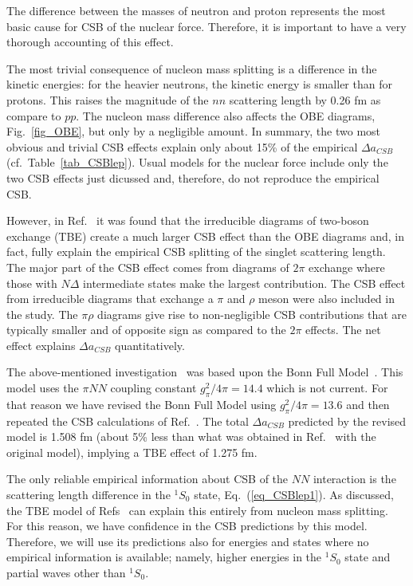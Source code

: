 The difference between the masses of  neutron and proton
represents the most basic cause for CSB of the nuclear force. 
Therefore, it is important to have a very thorough 
accounting of this effect. 

The most trivial consequence of nucleon mass splitting is a
difference in the kinetic energies: for the heavier neutrons,
the kinetic energy is smaller than for protons. 
This raises the magnitude of the $nn$ scattering length by
0.26 fm as compare to $pp$. 
The nucleon mass difference also affects the OBE diagrams, Fig.~\ref{fig_OBE},
but only by a negligible amount. In summary, the two most obvious and trivial
CSB effects explain only about 15\% of the empirical $\Delta a_{CSB}$
(cf.\ Table~\ref{tab_CSBlep}). 
Usual models for the nuclear force include only the two CSB effects 
just dicussed and, therefore, do not reproduce the empirical CSB.

However, in Ref.~\cite{LM98a} it was found that
the irreducible diagrams of
two-boson exchange (TBE) create a much larger CSB effect
than the OBE diagrams and, in fact, fully explain
the empirical CSB splitting of the singlet scattering length.
The major part of the CSB effect comes from diagrams of
$2\pi$ exchange where those with $N\Delta$ intermediate states
make the largest contribution. 
The CSB effect from
irreducible diagrams that exchange a $\pi$ and $\rho$ meson
were also included in the study.
The $\pi\rho$ diagrams give rise to non-negligible
CSB contributions that are typically smaller and of opposite 
sign as compared to the $2\pi$ effects. 
The net effect explains $\Delta a_{CSB}$ quantitatively.

The above-mentioned investigation~\cite{LM98a} was based upon the Bonn
Full Model~\cite{MHE87}.
This model uses the $\pi NN$ coupling constant $g^2_\pi/4\pi=14.4$ 
which is not current. For that reason we
have revised the Bonn Full Model using
$g^2_\pi/4\pi=13.6$ and then repeated the CSB calculations
of Ref.~\cite{LM98a}. The total $\Delta a_{CSB}$ predicted
by the revised model is 1.508 fm (about 5\% less than what was
obtained in Ref.~\cite{LM98a} with the original model),
implying a TBE effect of 1.275 fm.

The only reliable empirical information about CSB of the $NN$ interaction
is the scattering length difference in the $^1S_0$ state,
Eq.~(\ref{eq_CSBlep1}). As discussed,
the TBE model of Refs~\cite{MHE87,LM98a} can explain this
entirely from nucleon mass splitting.
For this reason, we have confidence in the CSB predictions
by this model. Therefore, we will use its predictions 
also for energies and states
where no empirical information is available; namely,
higher energies in the $^1S_0$ state and partial 
waves other than $^1S_0$.

